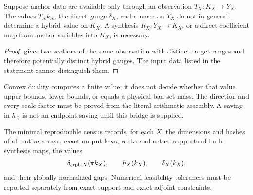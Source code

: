 \begin{proposition}\label{prop:common-target}
Suppose anchor data are available only through an observation
\(T_X:K_X\to Y_X\).  The values \(T_Xk_X\), the direct gauge
\(\delta_X\), and a norm on \(Y_X\) do not in general determine a
hybrid value on \(K_X\).  A synthesis \(R_X:Y_X\to K_X\), or a direct
coefficient map from anchor variables into \(K_X\), is necessary.
\end{proposition}

\begin{proof}
 gives two sections of the same observation with distinct
target ranges and therefore potentially distinct hybrid gauges.  The
input data listed in the statement cannot distinguish them.
\end{proof}

\begin{remark}
Convex duality computes a finite value; it does not decide whether that
value upper-bounds, lower-bounds, or equals a physical bad-set mass.
The direction and every scale factor must be proved from the literal
arithmetic assembly.  A saving in \(h_X\) is not an endpoint saving
until this bridge is supplied.
\end{remark}

The minimal reproducible census records, for each \(X\), the dimensions
and hashes of all native arrays, exact output keys, ranks and actual
supports of both synthesis maps, the values
\[
 \delta_{{\rm orph},X}(\pi k_X),
 \qquad
 h_X(k_X),
 \qquad
 \delta_X(k_X),
\]
and their globally normalized gaps.  Numerical feasibility tolerances
must be reported separately from exact support and exact adjoint
constraints.
